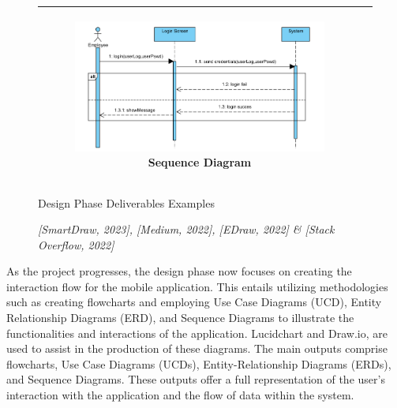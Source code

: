\begin{figure}[ht]
\begin{tabular}{|c|c|}
		\begin{subfigure}[b]{0.44\textwidth}
			\centering
			\vspace{0.2cm}
			\includegraphics[width=0.8\linewidth]{mainmatter/images/examplesequencediagram.png}
			\caption{Sequence Diagram}
         	\label{fig:myfig38}
		\end{subfigure}	\\
		\hline		
	\end{tabular}
    \caption{Design Phase Deliverables Examples}
	\caption*{\textit{[SmartDraw, 2023], [Medium, 2022], [EDraw, 2022] \& [Stack Overflow, 2022]}}
    \label{fig:the4fig}
\end{figure}

As the project progresses, the design phase now focuses on creating the interaction flow for the mobile application. This entails utilizing methodologies such as creating flowcharts and employing Use Case Diagrams (UCD), Entity Relationship Diagrams (ERD), and Sequence Diagrams to illustrate the functionalities and interactions of the application. Lucidchart and Draw.io, are used to assist in the production of these diagrams. The main outputs comprise flowcharts, Use Case Diagrams (UCDs), Entity-Relationship Diagrams (ERDs), and Sequence Diagrams. These outputs offer a full representation of the user's interaction with the application and the flow of data within the system.
\pagebreak

